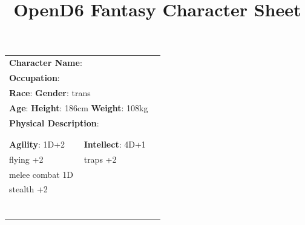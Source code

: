 \documentclass[10pt]{article}
\title{OpenD6 Fantasy Character Sheet}
\begin{document}
\pagestyle{fancy}
\fancyhf{}
\fancyfoot[R]{\thepage}
\renewcommand{\headrulewidth}{0pt}


\cleardoublepage
\begin{table}
\begin{tabular}{m{156pt} m{156pt} m{156pt}}
    \multicolumn{2}{l}{\textbf{Character Name}:  \hrulefill} \\
    \multicolumn{2}{l}{\textbf{Occupation}:  \hrulefill} \\
    \multicolumn{2}{l}{\textbf{Race}:  \hrulefill \hspace{1em} \textbf{Gender}: trans \hrulefill} \\
    \multicolumn{2}{l}{\textbf{Age}:  \hrulefill \hspace{1em} \textbf{Height}: 186cm \hrulefill \hspace{1em}  \textbf{Weight}: 108kg \hrulefill } \\
    \multicolumn{2}{l}{\textbf{Physical Description}:  \hrulefill } \\
    \multicolumn{2}{l}{ \hrulefill } \\
 & & \\
\textbf{Agility}: 1D+2 \hrulefill      & \textbf{Intellect}: 4D+1 \hrulefill  &                             \\

flying            +2 \hrulefill & traps             +2 \hrulefill & \\

melee combat      1D \hrulefill &  \hrulefill & \\

stealth           +2 \hrulefill &  \hrulefill & \\

 \hrulefill &  \hrulefill & \\

 \hrulefill &  \hrulefill & \\

 \hrulefill &  \hrulefill & \\

 \hrulefill &  \hrulefill & \\

 \hrulefill &  \hrulefill & \\

 \hrulefill &  \hrulefill & \\

 \hrulefill &  \hrulefill & \\


\end{tabular}
\end{table}
\end{document}
